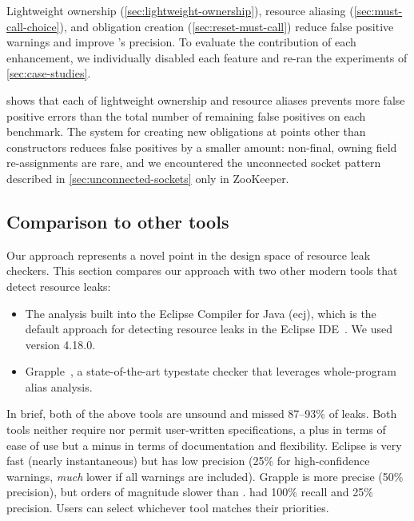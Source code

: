 Lightweight ownership (\cref{sec:lightweight-ownership}),
resource aliasing (\cref{sec:must-call-choice}), and
obligation creation (\cref{sec:reset-must-call})
reduce false positive warnings and improve \tool's precision.
To evaluate the contribution of each enhancement, we individually disabled each
feature and re-ran the experiments of \cref{sec:case-studies}.

 shows that each of lightweight
ownership and resource aliases prevents more false positive errors than the total number
of remaining false positives on each benchmark.
The system for creating new obligations at points other than constructors reduces
false positives by a smaller amount: non-final, owning field re-assignments
are rare,
and we encountered the unconnected socket pattern described in \cref{sec:unconnected-sockets}
only in ZooKeeper.

\subsection{Comparison to other tools}
\label{sec:compare}

Our approach represents a novel point in the design space of resource leak checkers.
%
This section compares our approach with two other modern tools that detect resource leaks:
\begin{itemize}
\item The analysis built into the Eclipse Compiler for Java (ecj), which is the default approach
  for detecting resource leaks in the Eclipse IDE~\cite{ecj-resource-leak}.
  We used version 4.18.0.
\item Grapple~\cite{zuo2019grapple}, a state-of-the-art typestate checker that
leverages whole-program alias analysis.
\end{itemize}
In brief, both of the above tools are unsound and missed 87--93\% of leaks.
Both tools neither require nor permit user-written specifications,
a plus in terms of ease of use but a minus in terms of documentation and
flexibility. Eclipse is very fast (nearly instantaneous) but has low precision
(25\% for high-confidence warnings, \emph{much} lower if all warnings are
included). Grapple is more precise (50\% precision), but
orders of
magnitude slower than \tool.  \Tool had 100\% recall and 25\%
precision.  Users can select whichever tool matches their priorities.

